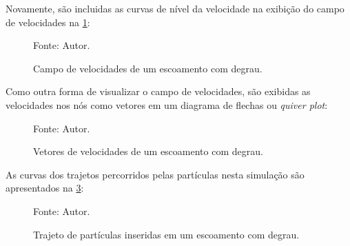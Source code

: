 Novamente, são incluidas as curvas de nível da velocidade na exibição do campo de velocidades na \ref{step_result}:
\begin{figure}[H]
    \centering
     {\raggedleft \scriptsize Fonte: Autor.}
    \caption{Campo de velocidades de um escoamento com degrau.}
    \label{step_result}
\end{figure}

Como outra forma de visualizar o campo de velocidades, são exibidas as velocidades nos nós como vetores em um diagrama de flechas ou \textit{quiver plot}:
\begin{figure}[H]
    \centering
     {\raggedleft \scriptsize Fonte: Autor.}
    \caption{Vetores de velocidades de um escoamento com degrau.}
    \label{step_velocity}
\end{figure}

As curvas dos trajetos percorridos pelas partículas nesta simulação são apresentados na \ref{step_trajectory}:
\begin{figure}[H]
    \centering
     {\raggedleft \scriptsize Fonte: Autor.}
    \caption{Trajeto de partículas inseridas em um escoamento com degrau.}
    \label{step_trajectory}
\end{figure}

